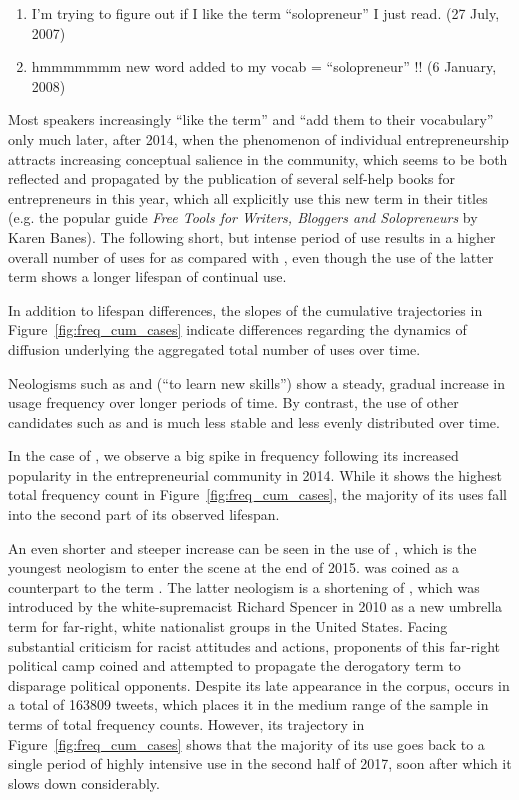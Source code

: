 \documentclass[
  a4paper,
  abstract=on,
  captions=tableabove
  ]{scrartcl}
\begin{document}
      \renewcommand{\labelenumi}{(\arabic{enumi})}
      \begin{enumerate}
        \item I'm trying to figure out if I like the term \enquote{solopreneur} I just read. (27 July, 2007)
        \item hmmmmmmm new word added to my vocab = \enquote{solopreneur} !! (6 January, 2008)
      \end{enumerate}

      Most speakers increasingly \enquote{like the term} and \enquote{add them to their vocabulary} only much later, after 2014, when the phenomenon of individual entrepreneurship attracts increasing conceptual salience in the community, which seems to be both reflected and propagated by the publication of several self-help books for entrepreneurs in this year, which all explicitly use this new term in their titles (e.g. the popular guide \emph{Free Tools for Writers, Bloggers and Solopreneurs} by Karen Banes). The following short, but intense period of use results in a higher overall number of uses for  as compared with , even though the use of the latter term shows a longer lifespan of continual use.

      In addition to lifespan differences, the slopes of the cumulative trajectories in Figure~\ref{fig:freq_cum_cases} indicate differences regarding the dynamics of diffusion underlying the aggregated total number of uses over time.

      Neologisms such as  and  (\enquote{to learn new skills}) show a steady, gradual increase in usage frequency over longer periods of time. By contrast, the use of other candidates such as  and  is much less stable and less evenly distributed over time.

      In the case of , we observe a big spike in frequency following its increased popularity in the entrepreneurial community in 2014. While it shows the highest total frequency count in Figure~\ref{fig:freq_cum_cases}, the majority of its uses fall into the second part of its observed lifespan.

      An even shorter and steeper increase can be seen in the use of , which is the youngest neologism to enter the scene at the end of 2015.  was coined as a counterpart to the term . The latter neologism is a shortening of , which was introduced by the white-supremacist Richard Spencer in 2010 as a new umbrella term for far-right, white nationalist groups in the United States. Facing substantial criticism for racist attitudes and actions, proponents of this far-right political camp coined and attempted to propagate the derogatory term  to disparage political opponents. Despite its late appearance in the corpus,  occurs in a total of \num{163809} tweets, which places it in the medium range of the sample in terms of total frequency counts. However, its trajectory in Figure~\ref{fig:freq_cum_cases} shows that the majority of its use goes back to a single period of highly intensive use in the second half of 2017, soon after which it slows down considerably.
\end{document}
